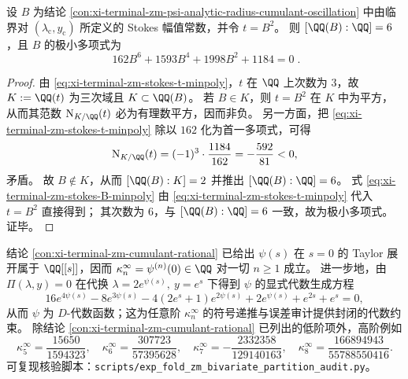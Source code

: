 \begin{theorem}\label{thm:xi-terminal-zm-stokes-amplitude-degree6-minpoly}
设 \(B\) 为结论 \ref{con:xi-terminal-zm-psi-analytic-radius-cumulant-oscillation} 中由临界对 \((\lambda_{\mathrm c},y_{\mathrm c})\) 所定义的 Stokes 幅值常数，并令 \(t=B^{2}\)。
则 \([\QQ(B):\QQ]=6\)，且 \(B\) 的极小多项式为
\begin{equation}\label{eq:xi-terminal-zm-stokes-B-minpoly}
\boxed{\;
162B^{6}+1593B^{4}+1998B^{2}+1184=0\; }.
\end{equation}
\end{theorem}
\begin{proof}
由 \eqref{eq:xi-terminal-zm-stokes-t-minpoly}，\(t\) 在 \(\QQ\) 上次数为 \(3\)，故 \(K:=\QQ(t)\) 为三次域且 \(K\subset \QQ(B)\)。
若 \(B\in K\)，则 \(t=B^{2}\) 在 \(K\) 中为平方，从而其范数 \(\mathrm{N}_{K/\QQ}(t)\) 必为有理数平方，因而非负。
另一方面，把 \eqref{eq:xi-terminal-zm-stokes-t-minpoly} 除以 \(162\) 化为首一多项式，可得
\[
\mathrm{N}_{K/\QQ}(t)=(-1)^{3}\cdot\frac{1184}{162}=-\frac{592}{81}<0,
\]
矛盾。
故 \(B\notin K\)，从而 \([\QQ(B):K]=2\) 并推出 \([\QQ(B):\QQ]=6\)。
式 \eqref{eq:xi-terminal-zm-stokes-B-minpoly} 由 \eqref{eq:xi-terminal-zm-stokes-t-minpoly} 代入 \(t=B^{2}\) 直接得到；
其次数为 \(6\)，与 \([\QQ(B):\QQ]=6\) 一致，故为极小多项式。证毕。
\end{proof}

\begin{conclusion}[全阶累积量密度的有理性与可审计生成方程]\label{con:xi-terminal-zm-cumulant-dalgebraic-equation}
结论 \ref{con:xi-terminal-zm-cumulant-rational} 已给出 \(\psi(s)\) 在 \(s=0\) 的 Taylor 展开属于 \(\QQ[[s]]\)，因而 \(\kappa_n^\infty=\psi^{(n)}(0)\in\QQ\) 对一切 \(n\ge 1\) 成立。
进一步地，由 \(\Pi(\lambda,y)=0\) 在代换
\(
\lambda=2e^{\psi(s)},\ y=e^{s}
\)
下得到 \(\psi\) 的显式代数生成方程
\[
16e^{4\psi(s)}-8e^{3\psi(s)}-4(2e^{s}+1)e^{2\psi(s)}+2e^{\psi(s)}+e^{2s}+e^{s}=0,
\]
从而 \(\psi\) 为 \(D\)-代数函数；这为任意阶 \(\kappa_n^\infty\) 的符号递推与误差审计提供封闭的代数约束。
除结论 \ref{con:xi-terminal-zm-cumulant-rational} 已列出的低阶项外，高阶例如
\[
\kappa_{5}^\infty=\frac{15650}{1594323},\quad
\kappa_{6}^\infty=\frac{307723}{57395628},\quad
\kappa_{7}^\infty=-\frac{2332358}{129140163},\quad
\kappa_{8}^\infty=\frac{166894943}{55788550416}.
\]
可复现核验脚本：\texttt{scripts/exp\_fold\_zm\_bivariate\_partition\_audit.py}。
\end{conclusion}


